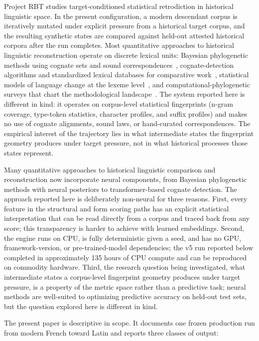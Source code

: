 \documentclass[11pt]{article}
\begin{document}
Project RBT studies target-conditioned statistical retrodiction in historical
linguistic space. In the present configuration, a modern descendant corpus is
iteratively mutated under explicit pressure from a historical target corpus,
and the resulting synthetic states are compared against held-out attested
historical corpora after the run completes. Most quantitative approaches to historical linguistic reconstruction
operate on discrete lexical units: Bayesian phylogenetic methods using
cognate sets and sound correspondences~\cite{bouchardcote2013,bouckaert2012},
cognate-detection algorithms and standardized lexical databases for
comparative work~\cite{forkel2018}, statistical models of language change
at the lexeme level~\cite{pagel2007}, and computational-phylogenetic
surveys that chart the methodological landscape~\cite{bowern2018}. The
system reported here is different in kind: it operates on corpus-level
statistical fingerprints (n-gram coverage, type-token statistics,
character profiles, and suffix profiles) and makes no use of cognate
alignments, sound laws, or hand-curated correspondences. The empirical
interest of the trajectory lies in what intermediate states the
fingerprint geometry produces under target pressure, not in what
historical processes those states represent.

Many quantitative approaches to historical linguistic comparison and
reconstruction now incorporate neural components, from Bayesian phylogenetic
methods with neural posteriors to transformer-based cognate detection. The
approach reported here is deliberately non-neural for three reasons. First,
every feature in the structural and form scoring paths has an explicit
statistical interpretation that can be read directly from a corpus and
traced back from any score; this transparency is harder to achieve with
learned embeddings. Second, the engine runs on CPU, is fully deterministic
given a seed, and has no GPU, framework-version, or pre-trained-model
dependencies; the v5 run reported below completed in approximately 135
hours of CPU compute and can be reproduced on commodity hardware. Third,
the research question being investigated, what intermediate states a
corpus-level fingerprint geometry produces under target pressure, is a
property of the metric space rather than a predictive task; neural methods
are well-suited to optimizing predictive accuracy on held-out test sets,
but the question explored here is different in kind.

The present paper is descriptive in scope. It documents one frozen production
run from modern French toward Latin and reports three classes of output:
\end{document}

